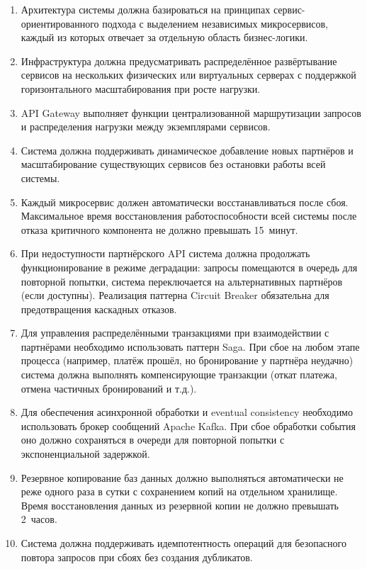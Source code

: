 \documentclass{bmstu}
\begin{document}
\begin{enumerate}
    \item Архитектура системы должна базироваться на принципах сервис-ориентированного подхода с выделением независимых микросервисов, каждый из которых отвечает за отдельную область бизнес-логики.
    
    \item Инфраструктура должна предусматривать распределённое развёртывание сервисов на нескольких физических или виртуальных серверах с поддержкой горизонтального масштабирования при росте нагрузки.
    
    \item API Gateway выполняет функции централизованной маршрутизации запросов и распределения нагрузки между экземплярами сервисов.
    
    \item Система должна поддерживать динамическое добавление новых партнёров и масштабирование существующих сервисов без остановки работы всей системы.
    
    \item Каждый микросервис должен автоматически восстанавливаться после сбоя. Максимальное время восстановления работоспособности всей системы после отказа критичного компонента не должно превышать 15~минут.
    
    \item При недоступности партнёрского API система должна продолжать функционирование в режиме деградации: запросы помещаются в очередь для повторной попытки, система переключается на альтернативных партнёров (если доступны). Реализация паттерна Circuit Breaker обязательна для предотвращения каскадных отказов.
    
    \item Для управления распределёнными транзакциями при взаимодействии с партнёрами необходимо использовать паттерн Saga. При сбое на любом этапе процесса (например, платёж прошёл, но бронирование у партнёра неудачно) система должна выполнять компенсирующие транзакции (откат платежа, отмена частичных бронирований и т.д.).
    
    \item Для обеспечения асинхронной обработки и eventual consistency необходимо использовать брокер сообщений Apache Kafka. При сбое обработки события оно должно сохраняться в очереди для повторной попытки с экспоненциальной задержкой.
    
    \item Резервное копирование баз данных должно выполняться автоматически не реже одного раза в сутки с сохранением копий на отдельном хранилище. Время восстановления данных из резервной копии не должно превышать 2~часов.
    
    \item Система должна поддерживать идемпотентность операций для безопасного повтора запросов при сбоях без создания дубликатов.
\end{enumerate}
\end{document}
